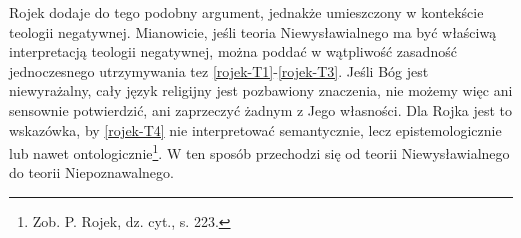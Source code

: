 %
%
%
%

Rojek dodaje do tego podobny argument, jednakże umieszczony w kontekście
teologii negatywnej. Mianowicie, jeśli teoria Niewysławialnego ma być
właściwą interpretacją teologii negatywnej, można poddać w wątpliwość
zasadność jednoczesnego utrzymywania tez \eqref{rojek-T1}-\eqref{rojek-T3}. Jeśli Bóg jest
niewyrażalny, cały język religijny jest pozbawiony znaczenia, nie
możemy więc ani sensownie potwierdzić, ani zaprzeczyć żadnym z Jego
własności. Dla Rojka jest to wskazówka, by \eqref{rojek-T4} nie interpretować
semantycznie, lecz epistemologicznie lub nawet ontologicznie\footnote{
Zob. P. Rojek, dz. cyt., s. 223. }. W ten sposób przechodzi się od
teorii Niewysławialnego do teorii Niepoznawalnego.


